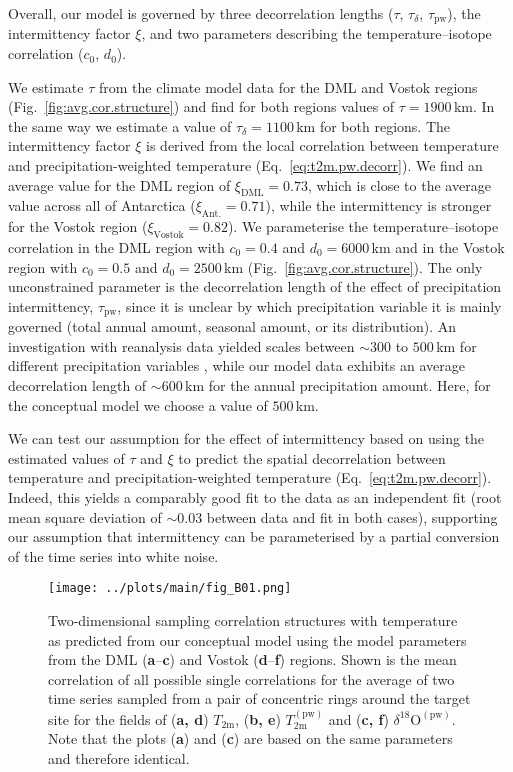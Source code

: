 \documentclass[draft]{agujournal2019}
\begin{document}
Overall, our model is governed by three decorrelation lengths ($\tau$,
$\tau_{\delta}$, $\tau_{\mathrm{pw}}$), the intermittency factor $\xi$, and two
parameters describing the temperature--isotope correlation ($c_0$, $d_0$).

We estimate $\tau$ from the climate model data for the DML and Vostok regions
(Fig.~\ref{fig:avg.cor.structure}) and find for both regions values of
$\tau=1900$\,km. In the same way we estimate a value of $\tau_{\delta}=1100$\,km
for both regions. The intermittency factor $\xi$ is derived from the local
correlation between temperature and precipitation-weighted temperature
(Eq.~\ref{eq:t2m.pw.decorr}). We find an average value for the DML region of
$\xi_{\mathrm{DML}}=0.73$, which is close to the average value across all of
Antarctica ($\xi_{\mathrm{Ant.}}=0.71$), while the intermittency is stronger for
the Vostok region ($\xi_{\mathrm{Vostok}}=0.82$). We parameterise the
temperature--isotope correlation in the DML region with $c_0=0.4$ and
$d_0=6000$\,km and in the Vostok region with $c_0=0.5$ and $d_0=2500$\,km
(Fig.~\ref{fig:avg.cor.structure}). The only unconstrained parameter is the
decorrelation length of the effect of precipitation intermittency,
$\tau_{\mathrm{pw}}$, since it is unclear by which precipitation variable it is
mainly governed (total annual amount, seasonal amount, or its distribution). An
investigation with reanalysis data yielded scales between $\sim300$ to $500$\,km
for different precipitation variables \cite{Munch2018a}, while our model data
exhibits an average decorrelation length of $\sim600$\,km for the annual
precipitation amount. Here, for the conceptual model we choose a value of
$500$\,km.

We can test our assumption for the effect of intermittency based on using the
estimated values of $\tau$ and $\xi$ to predict the spatial decorrelation
between temperature and precipitation-weighted temperature
(Eq.~\ref{eq:t2m.pw.decorr}). Indeed, this yields a comparably good fit to the
data as an independent fit (root mean square deviation of $\sim0.03$ between
data and fit in both cases), supporting our assumption that intermittency can be
parameterised by a partial conversion of the time series into white noise.

\begin{figure*}[t]%
\centering
\texttt{[image: ../plots/main/fig\_B01.png]}
\caption{%
  Two-dimensional sampling correlation structures with temperature as predicted
  from our conceptual model using the model parameters from the DML
  (\textbf{a}--\textbf{c}) and Vostok (\textbf{d}--\textbf{f}) regions. Shown
  is the mean correlation of all possible single correlations for the average of
  two time series sampled from a pair of concentric rings around the target site
  for the fields of (\textbf{a, d}) $T_{\mathrm{2m}}$, (\textbf{b, e})
  $T_{\mathrm{2m}}^{\mathrm{(pw)}}$ and (\textbf{c, f})
  $\delta^{18}\mathrm{O}^{\mathrm{(pw)}}$. Note that the plots (\textbf{a}) and
  (\textbf{c}) are based on the same parameters and therefore identical.}
\label{fig:conceptual.model}%
\end{figure*}%
\end{document}
